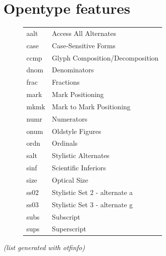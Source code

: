 \documentclass[10pt,a4paper,english]{article}
\begin{document}
\newpage
\section{Opentype features}
\label{sec:otfinfo}

\begin{figure}[ht]
	\centering
	\begin{tabular}{>{\ttfamily}l l}
		aalt & Access All Alternates \\
		case & Case-Sensitive Forms \\
		ccmp & Glyph Composition/Decomposition \\
		dnom & Denominators \\
		frac & Fractions \\
		mark & Mark Positioning \\
		mkmk & Mark to Mark Positioning \\
		numr & Numerators \\
		onum & Oldstyle Figures \\
		ordn & Ordinals \\
		salt & Stylistic Alternates \\
		sinf & Scientific Inferiors \\
		size & Optical Size \\
		ss02 & Stylistic Set 2 - alternate a \\
		ss03 & Stylistic Set 3 - alternate g \\
		subs & Subscript \\
		sups & Superscript	
	\end{tabular}
\end{figure}
\textit{(list generated with otfinfo)}
\end{document}
